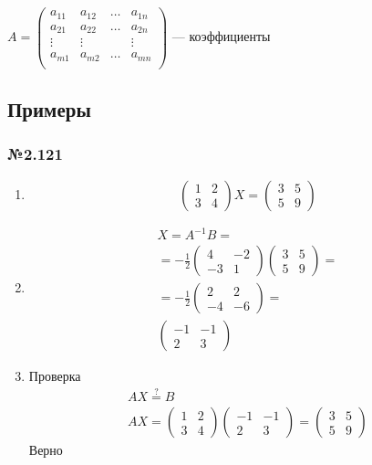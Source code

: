 \documentclass{article}
\begin{document}
$A = \begin{pmatrix}
	a_{11} & a_{12} & \dots & a_{1n} \\
	a_{21} & a_{22} & \dots & a_{2n} \\
	\vdots & \vdots & & \vdots \\
	a_{m1} & a_{m2} & \dots & a_{mn} \\
\end{pmatrix}$ --- коэффициенты

\subsection{Примеры}

\subsubsection*{№2.121}

\begin{enumerate}
	\item \[
	\begin{pmatrix}
		1 & 2 \\
		3 & 4
	\end{pmatrix} X =
	\begin{pmatrix}
		3 & 5 \\
		5 & 9
	\end{pmatrix}
	\]
	\item \begin{gather*}
		X = A^{-1} B = \\
		= -\frac{1}{2}
		\begin{pmatrix}
			4 & -2 \\
			-3 & 1
		\end{pmatrix}
		\begin{pmatrix}
			3 & 5 \\
			5 & 9
		\end{pmatrix} = \\
		= -\frac{1}{2}
		\begin{pmatrix}
			2 & 2 \\
			-4 & -6
		\end{pmatrix} = \\
		\begin{pmatrix}
			-1 & -1 \\
			2 & 3
		\end{pmatrix}
	\end{gather*}
	\item Проверка
	\begin{gather*}
		A X \stackrel{?}{=} B \\
		A X = \begin{pmatrix}
			1 & 2 \\
			3 & 4
		\end{pmatrix}
		\begin{pmatrix}
			-1 & -1 \\
			2 & 3
		\end{pmatrix}
		= \begin{pmatrix}
			3 & 5 \\
			5 & 9
		\end{pmatrix}
	\end{gather*}
	Верно
\end{enumerate}
\end{document}
